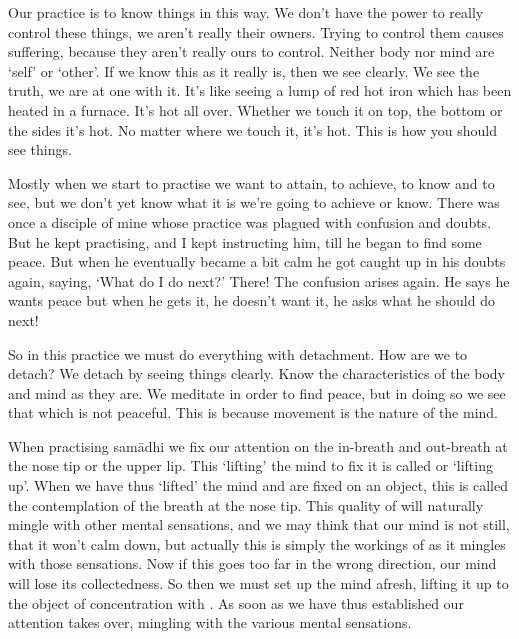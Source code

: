 Our practice is to know things in this way. We don't have the power to really control these things, we aren't really their owners. Trying to control them causes suffering, because they aren't really ours to control. Neither body nor mind are `self' or `other'. If we know this as it really is, then we see clearly. We see the truth, we are at one with it. It's like seeing a lump of red hot iron which has been heated in a furnace. It's hot all over. Whether we touch it on top, the bottom or the sides it's hot. No matter where we touch it, it's hot. This is how you should see things. 

Mostly when we start to practise we want to attain, to achieve, to know and to see, but we don't yet know what it is we're going to achieve or know. There was once a disciple of mine whose practice was plagued with confusion and doubts. But he kept practising, and I kept instructing him, till he began to find some peace. But when he eventually became a bit calm he got caught up in his doubts again, saying, `What do I do next?' There! The confusion arises again. He says he wants peace but when he gets it, he doesn't want it, he asks what he should do next! 

So in this practice we must do everything with detachment. How are we to detach? We detach by seeing things clearly. Know the characteristics of the body and mind as they are. We meditate in order to find peace, but in doing so we see that which is not peaceful. This is because movement is the nature of the mind. 

When practising sam\=adhi we fix our attention on the in-breath and out-breath at the nose tip or the upper lip. This `lifting' the mind to fix it is called  or `lifting up'. When we have thus `lifted' the mind and are fixed on an object, this is called  the contemplation of the breath at the nose tip. This quality of  will naturally mingle with other mental sensations, and we may think that our mind is not still, that it won't calm down, but actually this is simply the workings of  as it mingles with those sensations. Now if this goes too far in the wrong direction, our mind will lose its collectedness. So then we must set up the mind afresh, lifting it up to the object of concentration with . As soon as we have thus established our attention  takes over, mingling with the various mental sensations. 

